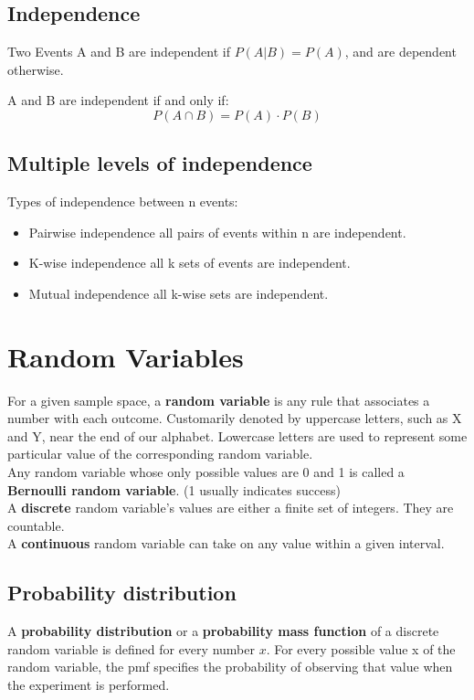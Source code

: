 \documentclass{article}
\begin{document}
{			\subsection*{Independence}
				Two Events A and B are independent if \(P(A|B) = P(A)\), and are dependent otherwise. 

				A and B are independent if and only if:
				\[
					P(A \cap B) = P(A) \cdot P(B)
				\]

			\subsection*{Multiple levels of independence}
				Types of independence between n events:
				\begin{itemize}
					\item Pairwise independence all pairs of events within n are independent.
					\item K-wise independence all k sets of events are independent.
					\item Mutual independence all k-wise sets are independent.
				\end{itemize} 

		\section*{\Large{\textbf{Random Variables}}}
			
			For a given sample space, a \textbf{random variable} is any rule that associates a number with each outcome. Customarily denoted by uppercase letters, such as X and Y, near the end of our alphabet. Lowercase letters are used to represent some particular value of the corresponding random variable.  \\

			Any random variable whose only possible values are 0 and 1 is called a \textbf{Bernoulli random variable}. (1 usually indicates success) \\ 

			A \textbf{discrete} random variable's values are either a finite set of integers. They are countable. \\ 

			A \textbf{continuous} random variable can take on any value within a given interval.

			\subsection*{Probability distribution}
				A \textbf{probability distribution} or a \textbf{probability mass function} of a discrete random variable is defined for every number \(x\). For every possible value x of the random variable, the pmf specifies the probability of observing that value when the experiment is performed.

}
\end{document}
